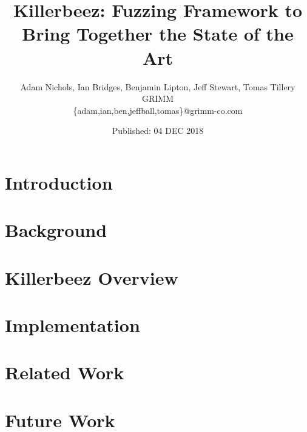 \documentclass[twocolumn]{article}
\title{Killerbeez: Fuzzing Framework to Bring Together the State of the Art}
\author{Adam Nichols, Ian Bridges, Benjamin Lipton, Jeff Stewart, Tomas Tillery \\
GRIMM\\
\{adam,ian,ben,jeffball,tomas\}@grimm-co.com}
\date{Published: 04 DEC 2018}
\begin{document}
\maketitle




\section{Introduction} \label{Introduction}


\section{Background} \label{Background}


\section{Killerbeez Overview} \label{Killerbeez Overview}


\section{Implementation} \label{Implementation}



\section{Related Work} \label{Related Work}


\section{Future Work} \label{Future Work}

\end{document}
